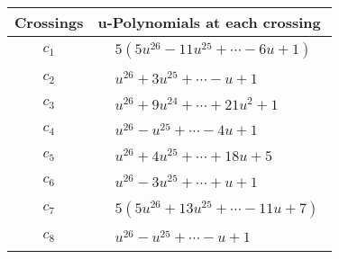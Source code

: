\documentclass[1p]{elsarticle_modified}
\theoremstyle{definition}
\begin{document}
\begin{tabular}{m{50pt}|m{274pt}}
Crossings & \hspace{64pt}u-Polynomials at each crossing \\
\hline $$\begin{aligned}c_{1}\end{aligned}$$&$\begin{aligned}
&5(5 u^{26}-11 u^{25}+\cdots-6 u+1)
\end{aligned}$\\
\hline $$\begin{aligned}c_{2}\end{aligned}$$&$\begin{aligned}
&u^{26}+3 u^{25}+\cdots- u+1
\end{aligned}$\\
\hline $$\begin{aligned}c_{3}\end{aligned}$$&$\begin{aligned}
&u^{26}+9 u^{24}+\cdots+21 u^2+1
\end{aligned}$\\
\hline $$\begin{aligned}c_{4}\end{aligned}$$&$\begin{aligned}
&u^{26}- u^{25}+\cdots-4 u+1
\end{aligned}$\\
\hline $$\begin{aligned}c_{5}\end{aligned}$$&$\begin{aligned}
&u^{26}+4 u^{25}+\cdots+18 u+5
\end{aligned}$\\
\hline $$\begin{aligned}c_{6}\end{aligned}$$&$\begin{aligned}
&u^{26}-3 u^{25}+\cdots+u+1
\end{aligned}$\\
\hline $$\begin{aligned}c_{7}\end{aligned}$$&$\begin{aligned}
&5(5 u^{26}+13 u^{25}+\cdots-11 u+7)
\end{aligned}$\\
\hline $$\begin{aligned}c_{8}\end{aligned}$$&$\begin{aligned}
&u^{26}- u^{25}+\cdots- u+1
\end{aligned}$\\

\end{tabular}
\end{document}
